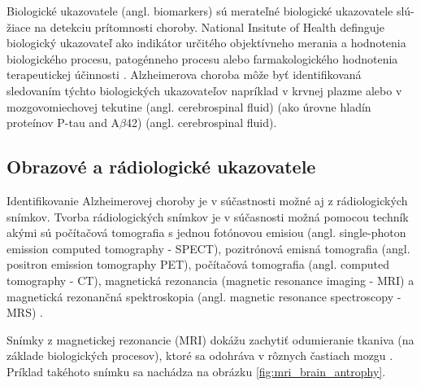 Biologické ukazovatele (angl. biomarkers) sú merateľné biologické ukazovatele slú-žiace na detekciu prítomnosti choroby.
National Insitute of Health definguje biologický ukazovateľ ako indikátor určitého objektívneho merania a hodnotenia biologického procesu, patogénneho procesu alebo farmakologického hodnotenia terapeutickej účinnosti \cite{working2001biomarkers}. Alzheimerova choroba môže byť identifikovaná sledovaním týchto biologických ukazovateľov napríklad v krvnej plazme \cite{khan2016biomarkers} alebo v mozgovomiechovej tekutine (angl. cerebrospinal fluid) (ako úrovne hladín proteínov P-tau and A$\beta$42) \cite{khan2016biomarkers} (angl. cerebrospinal fluid).

\subsection{Obrazové a rádiologické ukazovatele}

Identifikovanie Alzheimerovej choroby je v súčastnosti možné aj z rádiologických snímkov. Tvorba rádiologických snímkov je v súčasnosti možná pomocou techník akými sú počítačová tomografia s jednou fotónovou emisiou (angl. single-photon emission computed tomography - SPECT),
pozitrónová emisná tomografia (angl. positron emission tomography PET), počítačová tomografia (angl. computed tomography - CT), magnetická rezonancia (magnetic resonance imaging - MRI) a magnetická rezonančná spektroskopia (angl. magnetic resonance spectroscopy - MRS) \cite{khan2016biomarkers}.

Snímky z magnetickej rezonancie (MRI) dokážu zachytiť odumieranie tkaniva (na základe biologických procesov), ktoré sa odohráva v rôznych častiach mozgu \cite{khan2016biomarkers}. Príklad takéhoto snímku sa nachádza na obrázku \ref{fig:mri_brain_antrophy}.


